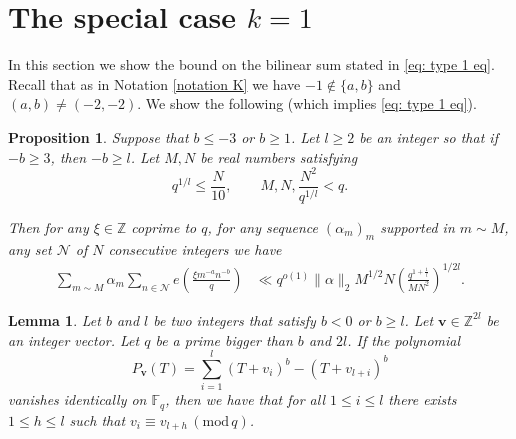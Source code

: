 \documentclass[12pt]{amsart}
\theoremstyle{plain}
\newtheorem{prop}[thm]{Proposition}
\newtheorem{lem}[thm]{Lemma}
\theoremstyle{definition}
\theoremstyle{remark}
\numberwithin{equation}{section}
\newcommand{\ZZ}{\mathbb{Z}}
\newcommand{\FF}{\mathbb{F}}
\newcommand{\mods}[1]{\,(\mathrm{mod}\,{#1})}
\renewcommand{\geq}{\geqslant}
\renewcommand{\leq}{\leqslant}
\begin{document}
\section{The special case $k=1$}\label{S: Kl1}


In this section we show the bound on the bilinear sum stated in \eqref{eq: type 1 eq}. Recall that as in Notation \ref{notation K} we have $-1\notin\{a,b\}$ and $(a,b)\neq (-2,-2)$. We show the following (which implies \eqref{eq: type 1 eq}).




\begin{prop}\label{prop:ab for e_q}Suppose that $b\leq -3$ or $b\geq 1$. Let $l\geq 2$ be an integer so that if $-b\geq 3$, then $-b\geq l$. Let $M,N$ be real numbers satisfying \[q^{1/l}\leq \frac{N}{10},\qquad M,N,\frac{N^2}{q^{1/l}}<q.\]

Then for any $\xi \in \ZZ$ coprime to $q$, for any sequence $(\alpha_m)_m$ supported in $m\sim M$, any set $\mathcal{N}$ of $N$ consecutive integers we have
\begin{align*}
   \sum_{m\sim M}\alpha_m\sum_{n\in \mathcal N} e\left(\frac{\xi m^{-a} n^{-b}}q\right)
&\ll q^{o(1)}\|\alpha\|_2 M^{1/2}N\left(\frac{q^{1+\frac{1}{l}}}{MN^2}\right)^{1/2l}.
    \end{align*}
\end{prop}

\begin{lem}\label{lem: Pierces trick} Let $b$ and $l$ be two integers that satisfy $b<0$ or $b\geq l$. Let $\mathbf{v}\in \ZZ^{2l}$ be an integer vector. Let $q$ be a prime bigger than $b$ and $2l$. If the polynomial 
    $$P_\mathbf{v}(T)=\sum_{i=1}^l(T+v_i)^b-(T+v_{l+i})^b$$ vanishes identically on $\FF_q$, then we have that for all $1\leq i\leq l $ there exists $1\leq h\leq l$ such that $v_i\equiv v_{l+h}\mods q$. 
\end{lem}
\end{document}
